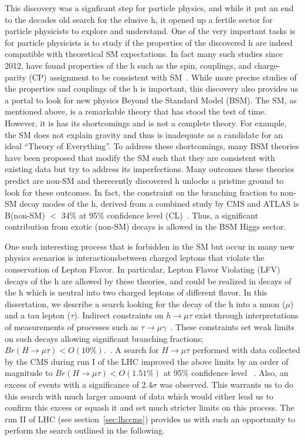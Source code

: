 This discovery was a signficant step for particle physics, and while it put an end to the decades old search for the elusive h, it opened up a fertile sector for particle physicists to explore and understand. One of the very important tasks is for particle physicists is to study if the properties of the discovered h are indeed compatible with theoretical SM expectations. In fact many such studies since 2012, have found properties of the h such as the spin, couplings, and charge-parity (CP) assignment to be consistent with SM~\cite{JHEP2016:45}. While more precise studies of the properties and couplings of the h is important, this discovery also provides us a portal to look for new physics Beyond the Standard Model (BSM). The SM, as mentioned above, is a remarkable theory that has stood the test of time. However, it is has its shortcomings and is not a complete theory. For example, the SM does not explain gravity and thus is inadequate as a candidate for an ideal ``Theory of Everything''. To address these shortcomings, many BSM theories have been proposed that modify the SM such that they are consistent with existing data but try to address its imperfections. Many outcomes these theories predict are non-SM and therecently discovered h unlocks a pristine ground to look for these outcomes. In fact, the constraint on the branching fraction to non-SM decay modes of the h, derived from a combined study by CMS and ATLAS is B(non-SM) $<$ 34\% at 95\% confidence level (CL)~\cite{JHEP2016:45}. Thus, a significant contribution from exotic (non-SM) decays is allowed in the BSM Higgs sector.

One such interesting process that is forbidden in the SM but occur in many new physics scenarios is interactionsbetween charged leptons that violate the conservation of Lepton Flavor. In particular, Lepton Flavor Violating (LFV) decays of the h are allowed by these theories, and could be realized in decays of the h which is neutral into two charged leptons of different flavor. In this dissertation, we describe a search looking for the decay of the h into a muon ($\mu$) and a tau lepton ($\tau$). Indirect constraints on $h \rightarrow \mu\tau$ exist through interpretations of measurements of processes such as $\tau \rightarrow \mu \gamma$~\cite{d}. These constraints set weak limits on such decays allowing significant branching fractions;$Br(H\rightarrow \mu \tau)<O(10\%).$~\cite{e}. A search for $H\rightarrow \mu \tau$ performed with data collected by the CMS during run I of the LHC  improved the above limits by an order of magnitude to $Br(H\rightarrow \mu \tau)<O(1.51\%)$ at 95\% confidence level ~\cite{df}. Also, an excess of events with a significance of 2.4$\sigma$ was observed. This warrants us to do this search with much larger amount of data which would either lead us to confirm this excess or squash it and set much stricter limits on this process. The run II of LHC (see section~\ref{sec:lhccms})  provides us with such an opportunity to perform the search outlined in the following.   





